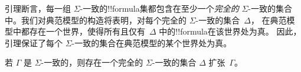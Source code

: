 \documentclass[../../../include/open-logic-section]{subfiles}
\begin{document}


引理断言，每一组 $\Sigma$-一致的!!{formula}集都包含在至少一个\emph{完全的}
$\Sigma$-一致的集合中。我们对典范模型的构造将表明，对每个完全的 $\Sigma$-一致的集合~$\Delta$，
在典范模型中都存在一个世界，使得所有且仅有~$\Delta$ 中的!!{formula}在该世界处为真。
因此，引理保证了每个 $\Sigma$-一致的集合在典范模型的某个世界处为真。

\begin{thm}
  若 $\Gamma$ 是 $\Sigma$-一致的，则存在一个完全的
  $\Sigma$-一致的集合 $\Delta$ 扩张~$\Gamma$。
\end{thm}
\end{document}
